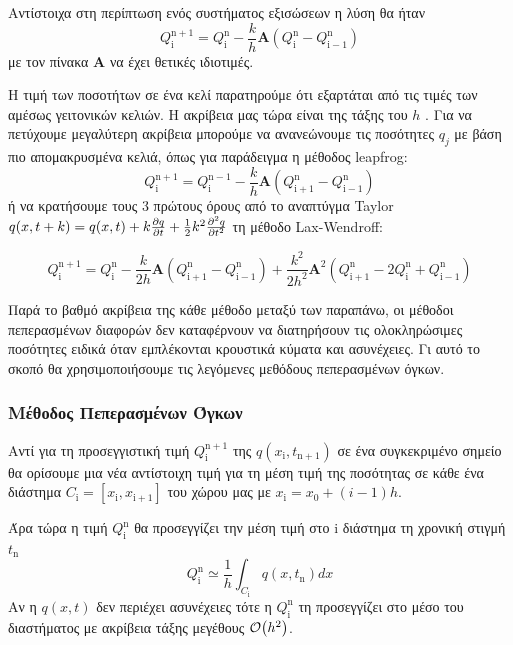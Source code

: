 Αντίστοιχα στη περίπτωση ενός συστήματος εξισώσεων η λύση θα ήταν
\begin{equation}
Q_{\mathrm{i}}^\mathrm{n+1} = Q_{\mathrm{i}}^\mathrm{n} -\frac{k}{h} \mathbf{Α} \left( Q_\mathrm{i}^\mathrm{n} - Q_\mathrm{i-1}^\mathrm{n} \right)
\end{equation} 
με τον πίνακα $\mathbf{Α}$ να έχει θετικές ιδιοτιμές. 

Η τιμή των ποσοτήτων σε ένα κελί παρατηρούμε ότι εξαρτάται από τις τιμές των αμέσως γειτονικών κελιών. Η ακρίβεια μας τώρα είναι της τάξης του $h$ . Για να πετύχουμε μεγαλύτερη ακρίβεια μπορούμε να ανανεώνουμε τις ποσότητες $q_j$ με βάση πιο απομακρυσμένα κελιά, όπως για παράδειγμα η μέθοδος leapfrog:
\begin{equation}
Q_{\mathrm{i}}^\mathrm{n+1} = Q_{\mathrm{i}}^\mathrm{n-1} -\frac{k}{h} \mathbf{Α} \left( Q_\mathrm{i+1}^\mathrm{n} - Q_\mathrm{i-1}^\mathrm{n} \right)
\end{equation} 
ή να κρατήσουμε τους 3 πρώτους όρους από το αναπτύγμα Taylor $q(x,t+k)=q(x,t)+k\pdv{q}{t}(x,t)+\frac{1}{2}k^2 \pdv[2]{q}{t}$ τη μέθοδο Lax-Wendroff:
 
 \begin{equation}
 Q_{\mathrm{i}}^\mathrm{n+1} = Q_{\mathrm{i}}^\mathrm{n} -\frac{k}{2h} \mathbf{Α} \left( Q_\mathrm{i+1}^\mathrm{n} - Q_\mathrm{i-1}^\mathrm{n} \right) +\frac{k^2}{2h^2} \mathbf{Α}^2 \left( Q_\mathrm{i+1}^\mathrm{n} - 2Q_{\mathrm{i}}^\mathrm{n}+ Q_\mathrm{i-1}^\mathrm{n} \right)
 \end{equation} 
 
 Παρά το βαθμό ακρίβεια της κάθε μέθοδο μεταξύ των παραπάνω, οι μέθοδοι πεπερασμένων διαφορών δεν καταφέρνουν να διατηρήσουν τις ολοκληρώσιμες ποσότητες ειδικά όταν εμπλέκονται κρουστικά κύματα και ασυνέχειες. Γι αυτό το σκοπό θα χρησιμοποιήσουμε τις λεγόμενες μεθόδους πεπερασμένων όγκων.
 
\subsubsection{Μέθοδος Πεπερασμένων Όγκων}
Αντί για τη προσεγγιστική τιμή $Q_{\mathrm{i}}^\mathrm{n+1}$ της $q(x_\mathrm{i},t_\mathrm{n+1})$ σε ένα συγκεκριμένο σημείο θα ορίσουμε μια νέα αντίστοιχη τιμή για τη μέση τιμή της ποσότητας σε κάθε ένα διάστημα $C_\mathrm{i}=[x_\mathrm{i},x_\mathrm{i+1}]$ του χώρου μας με $x_\mathrm{i}=x_0+(i-1)h$. 

Άρα τώρα η τιμή $Q_{\mathrm{i}}^\mathrm{n}$ θα προσεγγίζει την μέση τιμή στο $\mathrm{i}$ διάστημα τη χρονική στιγμή $t_\mathrm{n}$
\begin{equation}
Q_{\mathrm{i}}^\mathrm{n} \simeq \frac{1}{h} \int _{C_\mathrm{i}} q(x,t_\mathrm{n})dx
\end{equation}
Αν η $q(x,t)$ δεν περιέχει ασυνέχειες τότε η $Q_{\mathrm{i}}^\mathrm{n}$ τη προσεγγίζει στο μέσο του διαστήματος με ακρίβεια τάξης μεγέθους $\order{h^2}$.


